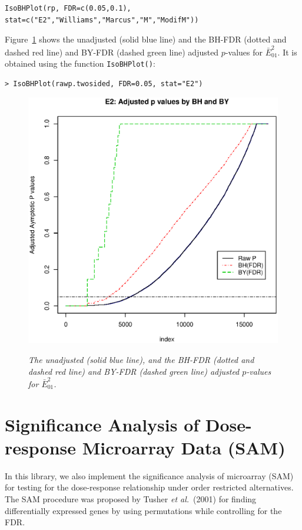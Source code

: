 \begin{center}
\begin{boxit}
\begin{verbatim}
IsoBHPlot(rp, FDR=c(0.05,0.1),
stat=c("E2","Williams","Marcus","M","ModifM"))
\end{verbatim}
\end{boxit}
\end{center}
Figure~\ref{IsoBHPlot} shows the unadjusted (solid blue line) and
the BH-FDR (dotted and dashed red line) and BY-FDR (dashed green
line) adjusted $p$-values for $\bar{E}^2_{01}$. It is obtained using
the function \texttt{IsoBHPlot()}:
\begin{center}
\begin{boxit}
\begin{verbatim}
> IsoBHPlot(rawp.twosided, FDR=0.05, stat="E2")
\end{verbatim}
\end{boxit}
\end{center}


\begin{figure}[!h]
\centering
{\includegraphics[width=.6\textwidth]{BHPlot1.eps}}
\caption{\em {The unadjusted (solid blue line), and the BH-FDR
(dotted and dashed red line) and BY-FDR (dashed green line) adjusted
$p$-values for $\bar{E}_{01}^2$.}} \label{IsoBHPlot}
\end{figure}



\section{Significance Analysis of Dose-response Microarray Data (SAM)}
In this library, we also implement the significance analysis of microarray (SAM) for testing 
for the dose-response relationship under order restricted alternatives. The SAM procedure was proposed
by Tusher \textit{et al.}\ (2001) for finding differentially expressed genes by using permutations while controlling for
the FDR. 

